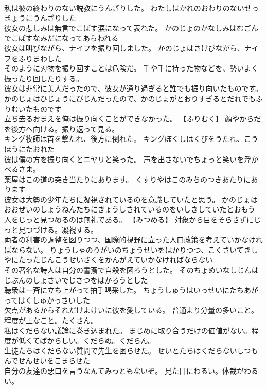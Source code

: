 \documentclass[8pt]{extreport}
\begin{document}
\begin{CJK}{UTF8}{min}
\\	私は彼の終わりのない説教にうんざりした。	わたしはかれのおわりのないせっきょうにうんざりした 
\\	彼女の悲しみは無言でこぼす涙になって表れた。	かのじょのかなしみはむごんでこぼすなみだになってあらわれる 
\\	彼女は叫びながら、ナイフを振り回しました。	かのじょはさけびながら、ナイフをふりまわした 
\\	そのように刃物を振り回すことは危険だ。	手や手に持った物などを、勢いよく振ったり回したりする。
\\	彼女は非常に美人だったので、彼女が通り過ぎると誰でも振り向いたものです。	かのじょはひじょうにびじんだったので、かのじょがとおりすぎるとだれでもふりむいたものです 
\\	立ち去るおまえを俺は振り向くことができなかった。	【ふりむく】 顔やからだを後方へ向ける。振り返って見る。
\\	キング牧師は首を撃たれ、後方に倒れた。	キングぼくしはくびをうたれ、こうほうにたおれた 
\\	彼は僕の方を振り向くとニヤリと笑った。	声を出さないでちょっと笑いを浮かべるさま。
\\	薬屋はこの道の突き当たりにあります。	くすりやはこのみちのつきあたりにあります 
\\	彼女は大勢の少年たちに凝視されているのを意識していたと思う。	かのじょはおおぜいのしょうねんたちにぎょうしされているのをいしきしていたとおもう 
\\	人をじっと見つめるのは無礼である。	【みつめる】 対象から目をそらさずにじっと見つづける。凝視する。
\\	両者の利害の調整を図りつつ、国際的視野に立った人口政策を考えていかなければならない。	りょうしゃのりがいのちょうせいをはかりつつ、こくさいてきしやにたったじんこうせいさくをかんがえていかなければならない 
\\	その著名な詩人は自分の書斎で自殺を図ろうとした。	そのちょめいなしじんはじぶんのしょさいでじさつをはかろうとした 
\\	聴衆は一斉に立ち上がって拍手喝采した。	ちょうしゅうはいっせいにたちあがってはくしゅかっさいした 
\\	欠点があるからそれだけよけいに彼を愛している。	普通より分量の多いこと。程度が上なこと。たくさん。
\\	私はくだらない議論に巻き込まれた。	まじめに取り合うだけの価値がない。程度が低くてばからしい。くだらぬ。くだらん。
\\	生徒たちはくだらない質問で先生を困らせた。	せいとたちはくだらないしつもんでせんせいをこまらせた 
\\	自分の友達の悪口を言うなんてみっともないぞ。	見た目にわるい。体裁がわるい。

\end{CJK}
\end{document}

